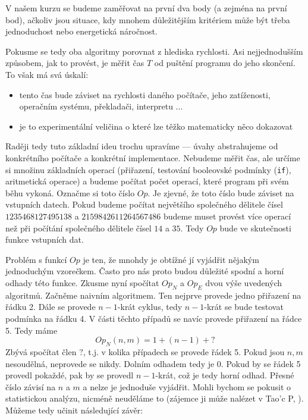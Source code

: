 V našem kurzu se budeme zaměřovat na první dva body (a zejména na první bod), ačkoliv jsou situace, kdy mnohem důležitějším
kritériem může být třeba jednoduchost nebo energetická náročnost.

Pokusme se tedy oba algoritmy porovnat z hlediska rychlosti. Asi nejjednodušším způsobem,
jak to provést, je měřit čas $T$ od puštění programu do jeho skončení. To však má svá úskalí:

\begin{itemize}
 \item tento čas bude záviset na rychlosti daného počítače, jeho zatíženosti, operačním systému, překladači, interpretu ...
 \item je to experimentální veličina o které lze těžko matematicky něco dokazovat
\end{itemize}

Raději tedy tuto základní ideu trochu upravíme --- úvahy abstrahujeme od konkrétního
počítače a konkrétní implementace. Nebudeme měřit čas, ale určíme si množinu
základních operací (přiřazení, testování booleovské podmínky ({\tt if}), aritmetická operace) a budeme počítat
počet operací,  které program při svém běhu vykoná. Označme si toto číslo $Op$. Je zjevné, že
toto číslo bude záviset na vstupních datech. Pokud budeme počítat největšího společného dělitele čísel
$1235468127495138$ a $2159842611264567486$ budeme muset provést více operací než při počítání společného dělitele čísel
$14$ a $35$. Tedy $Op$ bude ve skutečnosti funkce vstupních dat.

Problém s funkcí $Op$ je ten, že mnohdy je obtížné jí vyjádřit nějakým jednoduchým vzorečkem. Často pro nás proto budou
důležité spodní a horní odhady této funkce. Zkusme nyní spočítat $Op_N$ a $Op_E$ dvou výše uvedených algoritmů. Začněme
naivním algoritmem. Ten nejprve provede jedno přiřazení na řádku 2. Dále se provede $n-1$-krát cyklus, tedy $n-1$-krát
se bude testovat podmínka na řádku 4. V části těchto případů se navíc provede přiřazení na řádce 5. Tedy máme
\begin{displaymath}
 Op_N(n,m) = 1 + (n-1) + ?
\end{displaymath}
Zbývá spočítat člen $?$, t.j. v kolika případech se provede řádek 5. Pokud jsou $n,m$ nesoudělná, neprovede se nikdy.
Dolním odhadem tedy je $0$. Pokud by se řádek 5 provedl pokaždé, pak by se provedl $n-1$-krát, což je tedy horní odhad.
Přesné číslo závisí na $n$ a $m$ a nelze je jednoduše vyjádřit. Mohli bychom se pokusit o statistickou analýzu, nicméně
neuděláme to (zájemce ji může nalézet v Tao'c P, \cite{TAOCP2}). Můžeme tedy učinit následující závěr:


